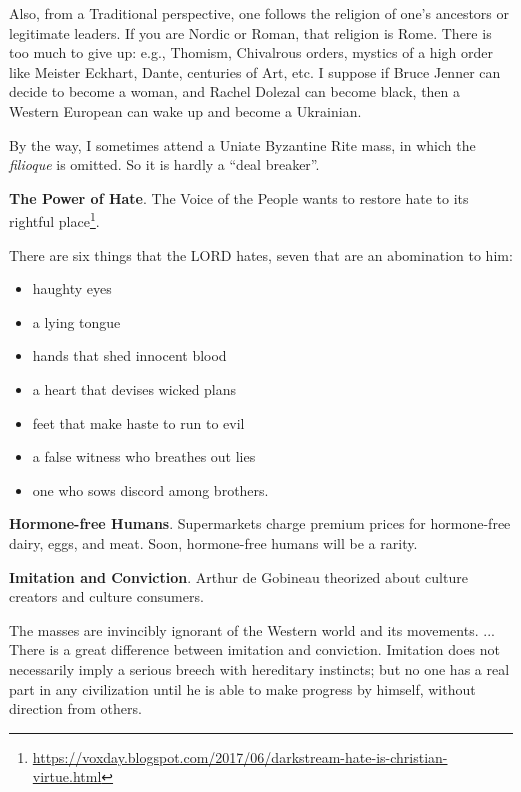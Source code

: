 Also, from a Traditional perspective, one follows the religion of one's ancestors or legitimate leaders. If you are Nordic or Roman, that religion is Rome. There is too much to give up: e.g., Thomism, Chivalrous orders, mystics of a high order like Meister Eckhart, Dante, centuries of Art, etc. I suppose if Bruce Jenner can decide to become a woman, and Rachel Dolezal can become black, then a Western European can wake up and become a Ukrainian.

By the way, I sometimes attend a Uniate Byzantine Rite mass, in which the \emph{filioque} is omitted. So it is hardly a ``deal breaker''.

\textbf{The Power of Hate}. The Voice of the People wants to restore hate to its rightful place\footnote{\url{https://voxday.blogspot.com/2017/06/darkstream-hate-is-christian-virtue.html}}.

\begin{quotex}
There are six things that the LORD hates, seven that are an abomination to him:

\begin{itemize}


\item haughty eyes

\item a lying tongue

\item hands that shed innocent blood

\item a heart that devises wicked plans

\item feet that make haste to run to evil

\item a false witness who breathes out lies

\item one who sows discord among brothers.
\end{itemize}

\end{quotex}


\textbf{Hormone-free Humans}. Supermarkets charge premium prices for hormone-free dairy, eggs, and meat. Soon, hormone-free humans will be a rarity.

\textbf{Imitation and Conviction}. Arthur de Gobineau theorized about culture creators and culture consumers.

\begin{quotex}
The masses are invincibly ignorant of the Western world and its movements. ... There is a great difference between imitation and conviction. Imitation does not necessarily imply a serious breech with hereditary instincts; but no one has a real part in any civilization until he is able to make progress by himself, without direction from others.
\end{quotex}


